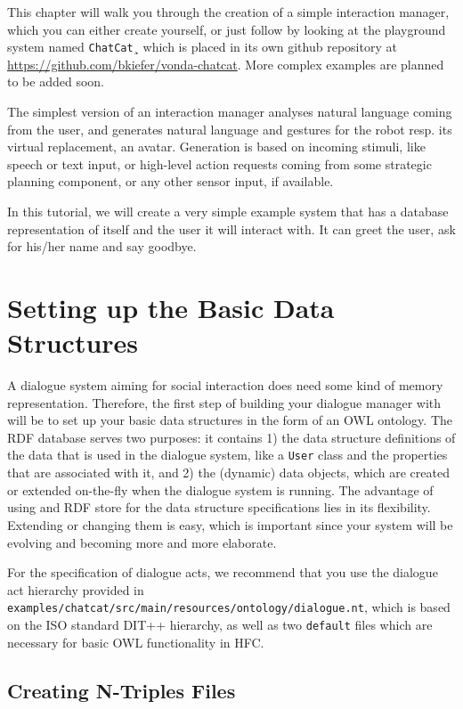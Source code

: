 This chapter will walk you through the creation of a simple interaction
manager, which you can either create yourself, or just follow by looking at the
playground system named \texttt{ChatCat}¸ which is placed in its own
github repository at \url{https://github.com/bkiefer/vonda-chatcat}.
More complex examples are planned to be added soon.

The simplest version of an interaction manager analyses natural language
coming from the user, and generates natural language and gestures for the robot
resp. its virtual replacement, an avatar. Generation is based on incoming
stimuli, like speech or text input, or high-level action requests coming from
some strategic planning component, or any other sensor input, if available.

In this tutorial, we will create a very simple example system that has a
database representation of itself and the user it will interact with. It can
greet the user, ask for his/her name and say goodbye.

\section{Setting up the Basic Data Structures}
\label{sec:example-hfc}

A dialogue system aiming for social interaction does need some kind of memory
representation. Therefore, the first step of building your dialogue manager
with \vonda will be to set up your basic data structures in the form of an OWL
ontology. The RDF database serves two purposes: it contains 1) the data
structure definitions of the data that is used in the dialogue system, like a
\texttt{User} class and the properties that are associated with it, and 2) the
(dynamic) data objects, which are created or extended on-the-fly when the
dialogue system is running. The advantage of using and RDF store for the data
structure specifications lies in its flexibility. Extending or changing them is
easy, which is important since your system will be evolving and becoming more
and more elaborate.

For the specification of dialogue acts, we recommend that you use the dialogue
act hierarchy provided in
\texttt{examples/chatcat/src/main/resources/ontology/dialogue.nt}, which is
based on the ISO standard DIT++ hierarchy, as well as two \texttt{default}
files which are necessary for basic OWL functionality in HFC.

\subsection{Creating N-Triples Files}

